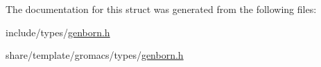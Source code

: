 \-The documentation for this struct was generated from the following files\-:\begin{DoxyCompactItemize}
\item 
include/types/\hyperlink{include_2types_2genborn_8h}{genborn.\-h}\item 
share/template/gromacs/types/\hyperlink{share_2template_2gromacs_2types_2genborn_8h}{genborn.\-h}\end{DoxyCompactItemize}
